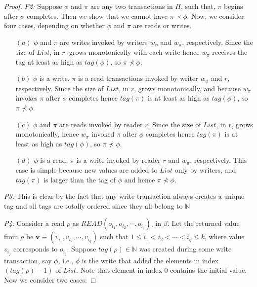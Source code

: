 \begin{proof}
	\emph{P2:}  Suppose $\phi$ and $ \pi$ are any two transactions in $\Pi$, such that, $\pi$ begins after $\phi$ completes. 
	Then we show that we cannot have $\pi \prec \phi$. Now, we consider four cases, depending on whether $\phi$ and $\pi$ are {\sc read}s or {\sc write}s.	
	\begin{enumerate}
	    \item [$(a)$] $\phi$ and $\pi$ are {\sc write}s invoked by writers $w_{\phi}$ and $w_{\pi}$, respectively. Since the size of $List$, in $r$,  grows monotonically with each {\sc write}  hence  $w_{\pi}$ receives the  tag at least as high as $tag(\phi)$, so $\pi\not \prec \phi$.
	       \item [$(b)$] $\phi$ is a {\sc write}, $\pi$ is a {\sc read} transactions invoked by writer $w_{\phi}$ and $r$, respectively.  
	        Since the size of $List$, in $r$,  grows monotonically, and because  $w_{\pi}$ invokes $\pi$ after $\phi$ completes hence  $tag(\pi)$ is at least as high as $tag(\phi)$, so $\pi\not \prec \phi$.
	        \item[$(c)$] $\phi$ and $\pi$ are {\sc read}s  invoked by reader $r$. 
	           Since the size of $List$, in $r$,  grows monotonically,  hence  $w_{\pi}$ invoked $\pi$ after $\phi$ completes hence $tag(\pi)$ is at least as high as $tag(\phi)$, so $\pi\not \prec \phi$.
	         \item [$(d)$] $\phi$ is a {\sc read}, $\pi$ is a {\sc write}  invoked by reader $r$ and $w_{\pi}$, respectively.
	         This case is simple because new values are added to $List$  only  by writers, and $tag(\pi)$ 
	         is larger than the tag of $\phi$ and hence   $\pi\not \prec \phi$. 
	\end{enumerate}
	
	\emph{P3:} This is clear by the fact that any {\sc write} transaction always creates a unique tag and all tags are totally ordered since they all belong to $\mathbb{N}$
	
	\emph{P4:} Consider a {\sc read} $\rho$ as $READ(o_{i_1}, o_{i_2}, \cdots, o_{i_q})$, in $\beta$. 
Let the returned value from $\rho$ be $\mathbf{v} \equiv $$(v_{i_1}, v_{i_2}, \cdots, v_{i_q})$ such that 
$1 \leq {i_1} <  {i_2} <  \cdots <  {i_q} \leq k$, where value  $v_{i_j}$ corresponds to $o_{i_j}$. 
	Suppose $tag(\rho) \in \mathbb{N}$ was created during some {\sc write} transaction, say $\phi$, i.e., $\phi$ is the {\sc write} that 
	added the elements in index $(tag(\rho)-1)$ of $List$. Note that element in index $0$ contains the initial value.
	 Now we consider two cases:
	 

\end{proof}
